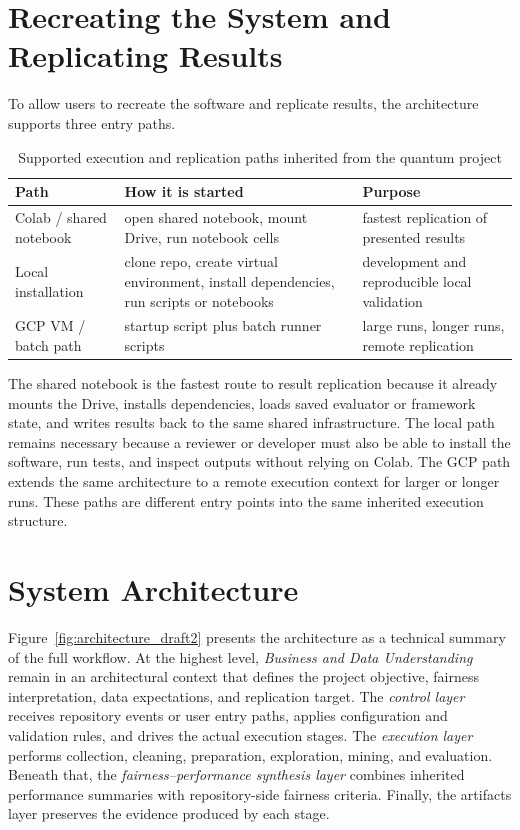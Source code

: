 \documentclass{IEEEtran}
\begin{document}
\section{Recreating the System and Replicating Results}
To allow users to recreate the software and replicate results, the architecture supports three entry paths.

\begin{table}[ht!]
\centering
\caption{Supported execution and replication paths inherited from the quantum project}
\label{tab:paths}
\begin{tabular}{p{1.8cm}p{2.8cm}p{2.7cm}}
\toprule
\textbf{Path} & \textbf{How it is started} & \textbf{Purpose} \\
\midrule
Colab / shared notebook & open shared notebook, mount Drive, run notebook cells & fastest replication of presented results \\
Local installation & clone repo, create virtual environment, install dependencies, run scripts or notebooks & development and reproducible local validation \\
GCP VM / batch path & startup script plus batch runner scripts & large runs, longer runs, remote replication \\
\bottomrule
\end{tabular}
\end{table}

The shared notebook is the fastest route to result replication because it already mounts the Drive, installs dependencies, loads saved evaluator or framework state, and writes results back to the same shared infrastructure. The local path remains necessary because a reviewer or developer must also be able to install the software, run tests, and inspect outputs without relying on Colab. The GCP path extends the same architecture to a remote execution context for larger or longer runs. These paths are different entry points into the same inherited execution structure.

\section{System Architecture}

Figure~\ref{fig:architecture_draft2} presents the architecture as a technical summary of the full workflow. At the highest level, \textit{Business and Data Understanding} remain in an architectural context that defines the project objective, fairness interpretation, data expectations, and replication target. The \textit{control layer} receives repository events or user entry paths, applies configuration and
validation rules, and drives the actual execution stages. The \textit{execution layer} performs collection, cleaning, preparation, exploration, mining, and evaluation. Beneath that, the \textit{fairness--performance synthesis layer} combines inherited performance summaries with repository-side fairness criteria. Finally, the artifacts layer preserves the evidence produced by each stage.
\end{document}
